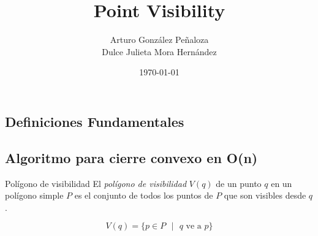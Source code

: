 \documentclass[aspectratio=169,xcolor=dvipsnames, t]{beamer}
\title[short title]{Point Visibility} %
\author{Arturo González Peñaloza\\ Dulce Julieta Mora Hernández}
\institute[Short title]{
  Universidad Nacional Autónoma de México
}
\date{\today} %
\let\oldsection\section
\renewcommand{\section}[2][\relax]{%
  \ifx#1\relax
    \oldsection{#2}%
  \else
    \oldsection[#1]{#2}%
  \fi%
  \label{sec:\thesection}%
}
\begin{document}
\maketitlepage
\begin{frame}[t]
  \tableofcontents
\end{frame}


\subsection{Definiciones Fundamentales}
\subsection{Algoritmo para cierre convexo en O(n)}


\begin{frame}{Polígono de visibilidad}
  El \textit{polígono de visibilidad} $V(q)$ de un punto $q$ en un polígono simple $P$ es el conjunto de todos los puntos de $P$ que son visibles desde $q$.
  \begin{center}
    \begin{equation*}
      V(q) = \{ p \in P \text{ } | \text{ } q \text{ ve a } p \}
    \end{equation*}
  \end{center}
\end{frame}
\end{document}
